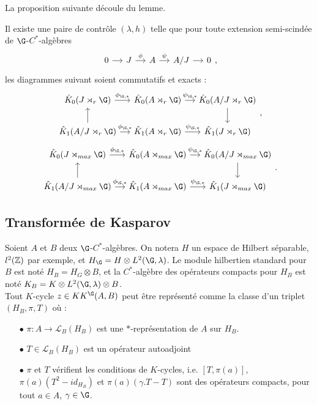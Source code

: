 La proposition suivante découle du lemme.
\begin{prop}
Il existe une paire de contrôle $(\lambda,h)$ telle que pour toute extension semi-scindée de $\G$-$C^*$-algèbres
\[\begin{tikzcd}[column sep = small]
0 \arrow{r} & J\arrow{r}{\phi}& A \arrow{r}{\psi} & A/J \arrow{r} & 0
\end{tikzcd},\]
les diagrammes suivant soient commutatifs et exacts :
\[\begin{tikzcd}[column sep = small]
\hat K_0(J\rtimes_r \G) \arrow{r}{\phi_{\G,*}}&\hat K_0( A\rtimes_r \G ) \arrow{r}{\psi_{\G,*}} & \hat K_0( A/J\rtimes_r \G) \arrow{d} \\
\hat K_1(A/J\rtimes_r \G) \arrow{u} \arrow{r}{\phi_{\G,*}}& \hat K_1( A\rtimes_r \G ) \arrow{r}{\psi_{\G,*}} & \hat K_1( J\rtimes_r \G)
\end{tikzcd},\]
\[\begin{tikzcd}[column sep = small]
\hat K_0(J\rtimes_{max} \G) \arrow{r}{\phi_{\G,*}}&\hat K_0( A\rtimes_{max} \G ) \arrow{r}{\psi_{\G,*}} & \hat K_0( A/J\rtimes_{max} \G) \arrow{d} \\
\hat K_1(A/J\rtimes_{max} \G) \arrow{u} \arrow{r}{\phi_{\G,*}}& \hat K_1( A\rtimes_{max} \G ) \arrow{r}{\psi_{\G,*}} & \hat K_1( J\rtimes_{max} \G)
\end{tikzcd}.\]
\end{prop}

\subsection{Transformée de Kasparov}
Soient $A$ et $B$ deux $\G$-$C^*$-algèbres. On notera $H$ un espace de Hilbert séparable, $l^2(\mathbb Z)$ par exemple, et $H_\G = H\otimes L^2(\G,\lambda)$. Le module hilbertien standard pour $B$ est noté $H_B=H_G\otimes B$, et la $C^*$-algèbre des opérateurs compacts pour $H_B$ est noté $K_B = K\otimes L^2(\G,\lambda)\otimes B$.\\

Tout $K$-cycle $z\in KK^\G(A,B)$ peut être représenté comme la classe d'un triplet $(H_B,\pi ,T)$ où :\\

\begin{itemize}
\item[$\bullet$] $\pi : A \rightarrow \mathcal L_B(H_B)$ est une $*$-représentation de $A$ sur $H_B$.
\item[$\bullet$] $T\in \mathcal L_B(H_B)$ est un opérateur autoadjoint
\item[$\bullet$] $\pi$ et $T$ vérifient les conditions de $K$-cycles, i.e. $[T,\pi(a)]$, $\pi(a)(T^2-id_{H_B})$ et $\pi(a)(\gamma.T-T)$ sont des opérateurs compacts, pour tout $a\in A$, $\gamma\in \G$.\\
\end{itemize} 


